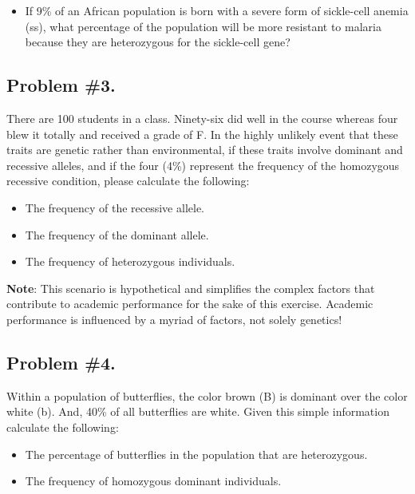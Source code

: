 \documentclass[
  a4paper]{book}
\providecommand{\tightlist}{%
  \setlength{\itemsep}{0pt}\setlength{\parskip}{0pt}}
\begin{document}
\begin{itemize}
\tightlist
\item
  If 9\% of an African population is born with a severe form of sickle-cell anemia (ss), what percentage of the population will be more resistant to malaria because they are heterozygous for the sickle-cell gene?
\end{itemize}

\hypertarget{problem-3.}{%
\subsection{Problem \#3.}\label{problem-3.}}

There are 100 students in a class. Ninety-six did well in the course whereas four blew it totally and received a grade of F. In the highly unlikely event that these traits are genetic rather than environmental, if these traits involve dominant and recessive alleles, and if the four (4\%) represent the frequency of the homozygous recessive condition, please calculate the following:

\begin{itemize}
\tightlist
\item
  The frequency of the recessive allele.
\item
  The frequency of the dominant allele.
\item
  The frequency of heterozygous individuals.
\end{itemize}

\textbf{Note}: This scenario is hypothetical and simplifies the complex factors that contribute to academic performance for the sake of this exercise. Academic performance is influenced by a myriad of factors, not solely genetics!

\hypertarget{problem-4.}{%
\subsection{Problem \#4.}\label{problem-4.}}

Within a population of butterflies, the color brown (B) is dominant over the color white (b). And, 40\% of all butterflies are white. Given this simple information calculate the following:

\begin{itemize}
\tightlist
\item
  The percentage of butterflies in the population that are heterozygous.
\item
  The frequency of homozygous dominant individuals.
\end{itemize}
\end{document}

